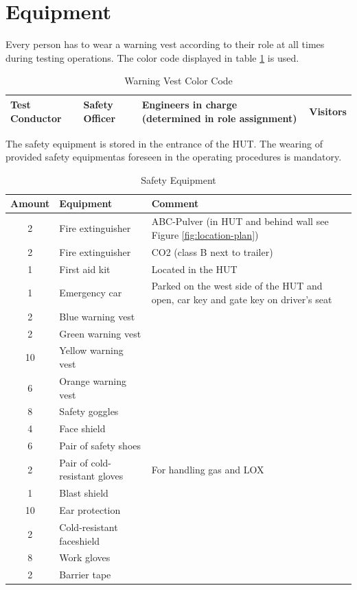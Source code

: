 \documentclass{article}
\begin{document}
\section{Equipment}
Every person has to wear a warning vest according to their role at all times during testing operations. The color code displayed in table \ref{tab:color-code} is used.
\begin{table}[h]
    \caption{Warning Vest Color Code}
    \label{tab:color-code}
    \begin{tabularx}{0.9\textwidth}{|X|X|X|X|}
        \hline
        \cellcolor{cyan} Test Conductor & \cellcolor{green} Safety Officer & \cellcolor{orange} Engineers in charge (determined in role assignment) & \cellcolor{yellow} Visitors \\ \hline
    \end{tabularx}
\end{table}
The safety equipment is stored in the entrance of the HUT. The wearing of provided safety equipmentas foreseen in the operating procedures is mandatory.
\begin{table}[h]
    \caption{Safety Equipment}
    \label{tab:safety-equipment}
    \begin{tabularx}{0.9\textwidth}{|c|X|X|}
        \hline
        \rowcolor{tableHeaderColor} \textbf{Amount} & \textbf{Equipment} & \textbf{Comment} \\ \hline
        2 & Fire extinguisher & ABC-Pulver (in HUT and behind wall see Figure \ref{fig:location-plan}) \\ \hline
        2 & Fire extinguisher & CO2 (class B next to trailer) \\ \hline
        1 & First aid kit & Located in the HUT \\ \hline
        1 & Emergency car & Parked on the west side of the HUT and open, car key and gate key on driver's seat \\ \hline
        2 & Blue warning vest & \\ \hline
        2 & Green warning vest & \\ \hline
        10 & Yellow warning vest & \\ \hline
        6 & Orange warning vest & \\ \hline
        8 & Safety goggles & \\ \hline
        4 & Face shield & \\ \hline
        6 & Pair of safety shoes & \\ \hline
        2 & Pair of cold-resistant gloves & For handling gas and LOX \\ \hline
        1 & Blast shield & \\ \hline
        10 & Ear protection & \\ \hline
        2 & Cold-resistant faceshield & \\ \hline
        8 & Work gloves & \\ \hline
        2 & Barrier tape & \\ \hline
    \end{tabularx}
\end{table}
\end{document}
